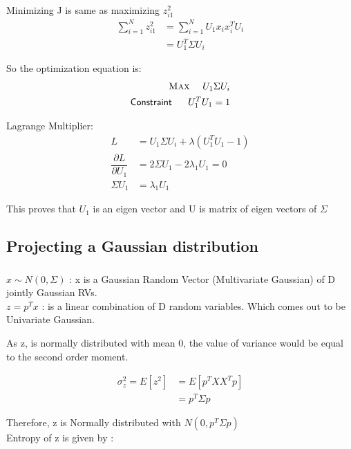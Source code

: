 \documentclass[paper=a4, fontsize=11pt]{scrartcl} %
\numberwithin{equation}{section} %
\numberwithin{figure}{section} %
\numberwithin{table}{section} %
\begin{document}
Minimizing J is same as maximizing $z_{i1}^{2}$
\begin{align*} 
\sum_{i=1}^{N} z_{i1}^{2} &= \sum_{i=1}^{N} U_{1}x_{i}x_{i}^{T}U_{i}\\
&= U_{1}^{T}\Sigma U_{i}
\end{align*}

So the optimization equation is:
\begin{align*} 
\textsc{Max}  ~~~~U_{1}\Sigma U_{i}\\
\textsf{Constraint}~~~~~ U^{T}_{1}U_{1}=1\\
\end{align*}

Lagrange Multiplier:
\begin{align*} 
L &= U_{1}\Sigma U_{i} + \lambda (U^{T}_{1}U_{1}-1)\\
\dfrac{\partial L}{\partial U_{1}} &= 2\Sigma U_{1} - 2\lambda_{1}U_{1}=0\\
\Sigma U_{1} &= \lambda_{1}U_{1}
\end{align*}

This proves that $U_{1}$ is an eigen vector and U is matrix of eigen vectors of $\Sigma$

\subsection{Projecting a Gaussian distribution}
\subsubsection{}

$x \sim N(0,\Sigma)$ : x is a Gaussian Random Vector (Multivariate Gaussian) of D jointly Gaussian RVs.\\

$z = p^{T}x$ : is a linear combination of D random variables. Which comes out to be Univariate Gaussian.

As z, is normally distributed with mean 0, the value of variance would be equal to the second order moment.

\begin{align*} 
\sigma_{z}^{2} = E[z^{2}] &= E[p^{T}XX^{T}p]\\
&= p^{T}\Sigma p
\end{align*}

Therefore, z is Normally distributed with $N(0,p^{T}\Sigma p)$\\

Entropy of z is given by :\\
\end{document}
